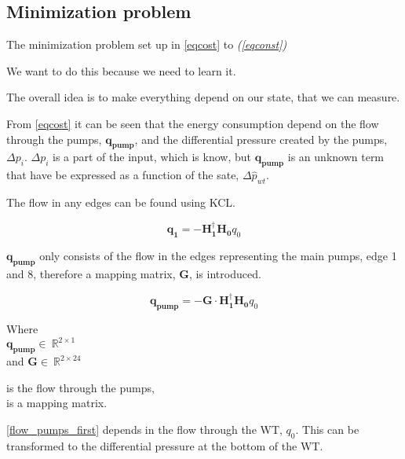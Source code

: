 \subsection{Minimization problem}
\label{mini_problem}

The minimization problem set up in \eqref{eqcost} to \textit{(\ref{eqconst})}

We want to do this because we need to learn it. 

The overall idea is to make everything depend on our state, that we can measure. 

From \eqref{eqcost} it can be seen that the energy consumption depend on the flow through the pumps, $\pmb{q_{pump}}$, and the differential pressure created by the pumps, $\Delta{p}_i$. $\Delta{p}_i$ is a part of the input, which is know, but $\pmb{q_{pump}}$ is an unknown term that have be expressed as a function of the sate, $\Delta \hat{p}_{wt}$. 

The flow in any edges can be found using KCL. 

\begin{equation}
\pmb{q_1} = -\pmb{H_1^{\dagger} H_0} q_0
\end{equation}

$\pmb{q_{pump}}$ only consists of the flow in the edges representing the main pumps, edge 1 and 8, therefore a mapping matrix, $\pmb{G}$, is introduced. 

\begin{equation}
\pmb{q_{pump}} = - \pmb{G} \cdot \pmb{H_1^{\dagger} H_0} q_0 \label{flow_pumps_first}
\end{equation}

\begin{minipage}[t]{0.24\textwidth}
Where\\
\hspace*{8mm} $\pmb{q_{pump}} \in \: \mathbb{R}^{2 \times 1}$  \\
and \hspace*{0.4mm} $\pmb{G} \in \: \mathbb{R}^{2 \times 24} $ 
\end{minipage}
\begin{minipage}[t]{0.70\textwidth}
\vspace*{2mm}
\hspace*{4mm} is the flow through the pumps,\\
\hspace*{4mm} is a mapping matrix.
\end{minipage}

\eqref{flow_pumps_first} depends in the flow through the WT, $q_0$. This can be transformed to the differential pressure at the bottom of the WT.

